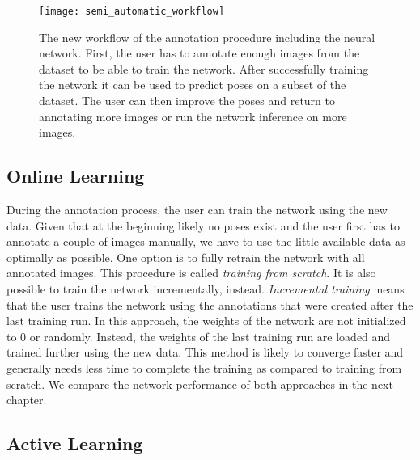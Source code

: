 \begin{figure}[!tbp]
	\centering
    \texttt{[image: semi\_automatic\_workflow]}
    \caption{The new workflow of the annotation procedure including the neural network. First, the user has to annotate enough images from the dataset to be able to train the network. After successfully training the network it can be used to predict poses on a subset of the dataset. The user can then improve the poses and return to annotating more images or run the network inference on more images.}
    	\label{fig:semi_automatic_workflow}
\end{figure}

\subsection{Online Learning} \label{subsection:online_learning}

During the annotation process, the user can train the network using the new data. Given that at the beginning likely no poses exist and the user first has to annotate a couple of images manually, we have to use the little available data as optimally as possible. One option is to fully retrain the network with all  annotated images. This procedure is called \textit{training from scratch}. It is also possible to train the network incrementally, instead. \textit{Incremental training} means that the user trains the network using the annotations that were created after the last training run. In this approach, the weights of the network are not initialized to 0 or randomly. Instead, the weights of the last training run are loaded and trained further using the new data. This method is likely to converge faster and generally needs less time to complete the training as compared to training from scratch. We compare the network performance of both approaches in the next chapter.

\subsection{Active Learning} \label{subsection:active_learning}

